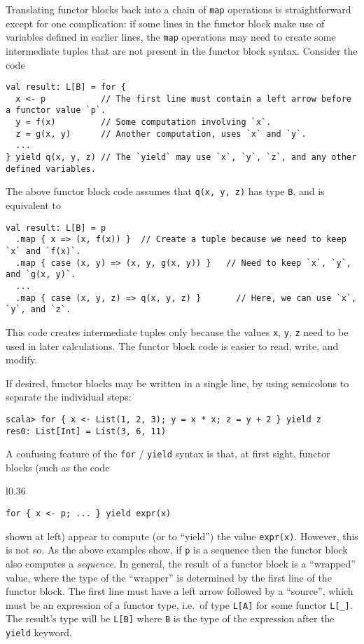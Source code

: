 Translating functor blocks back into a chain of \lstinline!map! operations
is straightforward except for one complication: if some lines in the
functor block make use of variables defined in earlier lines, the
\lstinline!map! operations may need to create some intermediate tuples
that are not present in the functor block syntax. Consider the code
\begin{lstlisting}
val result: L[B] = for {
  x <- p           // The first line must contain a left arrow before a functor value `p`.
  y = f(x)         // Some computation involving `x`.
  z = g(x, y)      // Another computation, uses `x` and `y`.
  ...
} yield q(x, y, z) // The `yield` may use `x`, `y`, `z`, and any other defined variables.
\end{lstlisting}
The above functor block code assumes that \lstinline!q(x, y, z)!
has type \lstinline!B!, and is equivalent to
\begin{lstlisting}
val result: L[B] = p
  .map { x => (x, f(x)) }  // Create a tuple because we need to keep `x` and `f(x)`.
  .map { case (x, y) => (x, y, g(x, y)) }   // Need to keep `x`, `y`, and `g(x, y)`.
  ...
  .map { case (x, y, z) => q(x, y, z) }       // Here, we can use `x`, `y`, and `z`.
\end{lstlisting}
This code creates intermediate tuples only because the values \lstinline!x!,
\lstinline!y!, \lstinline!z! need to be used in later calculations.
The functor block code is easier to read, write, and modify. 

If desired, functor blocks may be written in a single line, by using
semicolons to separate the individual steps:
\begin{lstlisting}
scala> for { x <- List(1, 2, 3); y = x * x; z = y + 2 } yield z
res0: List[Int] = List(3, 6, 11)
\end{lstlisting}

A confusing feature of the \lstinline!for! / \lstinline!yield! syntax
is that, at first sight, functor blocks (such as the code\begin{wrapfigure}{l}{0.36\columnwidth}%
\vspace{-0.8\baselineskip}
\begin{lstlisting}
for { x <- p; ... } yield expr(x)
\end{lstlisting}

\vspace{-0.8\baselineskip}
\end{wrapfigure}%
 shown at left) appear to compute (or to \textsf{``}yield\textsf{''}) the value \lstinline!expr(x)!.
However, this is not so. As the above examples show, if \lstinline!p!
is a sequence then the functor block also computes a \emph{sequence}.
In general, the result of a functor block is a \textsf{``}wrapped\textsf{''} value,
where the type of the \textsf{``}wrapper\textsf{''} is determined by the first line
of the functor block. The first line must have a left arrow followed
by a \textsf{``}source\textsf{''}, which must be an expression
of a functor type, i.e.~of type \lstinline!L[A]! for some functor
\lstinline!L[_]!. The result\textsf{'}s type will be \lstinline!L[B]! where
\lstinline!B! is the type of the expression after the \lstinline!yield!
keyword.

